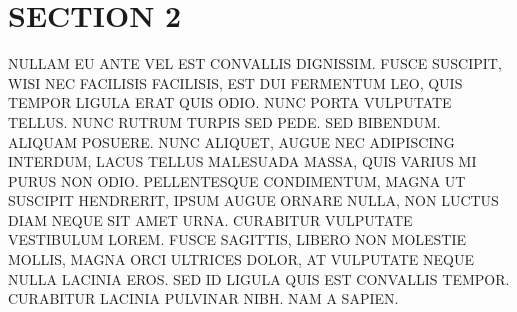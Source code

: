 \section{SECTION 2}

NULLAM EU ANTE VEL EST CONVALLIS DIGNISSIM.  FUSCE SUSCIPIT, WISI NEC FACILISIS FACILISIS, EST DUI FERMENTUM LEO, QUIS TEMPOR LIGULA ERAT QUIS ODIO.  NUNC PORTA VULPUTATE TELLUS.  NUNC RUTRUM TURPIS SED PEDE.  SED BIBENDUM.  ALIQUAM POSUERE.  NUNC ALIQUET, AUGUE NEC ADIPISCING INTERDUM, LACUS TELLUS MALESUADA MASSA, QUIS VARIUS MI PURUS NON ODIO.  PELLENTESQUE CONDIMENTUM, MAGNA UT SUSCIPIT HENDRERIT, IPSUM AUGUE ORNARE NULLA, NON LUCTUS DIAM NEQUE SIT AMET URNA.  CURABITUR VULPUTATE VESTIBULUM LOREM.  FUSCE SAGITTIS, LIBERO NON MOLESTIE MOLLIS, MAGNA ORCI ULTRICES DOLOR, AT VULPUTATE NEQUE NULLA LACINIA EROS.  SED ID LIGULA QUIS EST CONVALLIS TEMPOR.  CURABITUR LACINIA PULVINAR NIBH.  NAM A SAPIEN.
